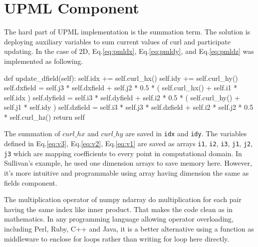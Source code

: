 \section{UPML Component}
The hard part of UPML implementation is the summation term. The solution is deploying auxiliary variables to sum current
values of curl and participate updating. In the case of 2D, Eq.\ref{eq:pmldx}, Eq.\ref{eq:pmldy}, and Eq.\ref{eq:pmldz}
was implemented as following.
\begin{code}
    def update_dfield(self):
        self.idx += self.curl_hx()
        self.idy += self.curl_hy()
        self.dxfield = self.j3 * self.dxfield 
                     + self.j2 * 0.5 * ( self.curl_hx() + self.i1 * self.idx )
        self.dyfield = self.i3 * self.dyfield 
                     + self.i2 * 0.5 * ( self.curl_hy() + self.j1 * self.idy )
        self.dzfield = self.i3 * self.j3 * self.dzfield 
                     + self.i2 * self.j2 * 0.5 * self.curl_hz()
        return self
\end{code}
The summation of $curl\_hx$ and $curl\_hy$ are saved in \texttt{idx} and \texttt{idy}. The variables defined in
Eq.\ref{eq:v3}, Eq.\ref{eq:v2}, Eq.\ref{eq:v1} are saved as arrays \texttt{i1}, \texttt{i2}, \texttt{i3}, \texttt{j1},
\texttt{j2}, \texttt{j3} which are mapping coefficients to every point in computational domain. In Sullivan's example,
he used one dimension arrays to save memory here. However, it's more intuitive and programmable using array having
dimension the same as fields component.

The multiplication operator of numpy ndarray do multiplication for each pair having the same index like inner
product. That makes the code clean as in mathematics. In any programming language allowing operator overloading,
including Perl, Ruby, C++ and Java, it is a better alternative using a function as middleware to enclose for loops
rather than writing for loop here directly.
